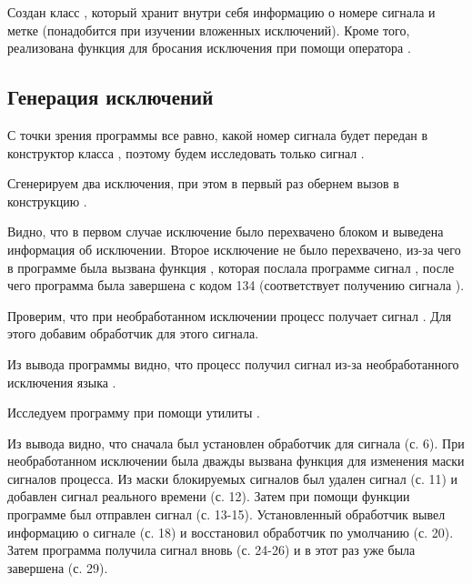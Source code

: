 Создан класс , который хранит внутри себя информацию о номере сигнала и метке (понадобится при изучении вложенных исключений). Кроме того, реализована функция  для бросания исключения при помощи оператора .

\subsection{Генерация исключений}

С точки зрения программы все равно, какой номер сигнала будет передан в конструктор класса , поэтому будем исследовать только сигнал .

Сгенерируем два исключения, при этом в первый раз обернем вызов  в конструкцию .


Видно, что в первом случае исключение было перехвачено блоком  и выведена информация об исключении. Второе исключение не было перехвачено, из-за чего в программе была вызвана функция , которая послала программе сигнал , после чего программа была завершена с кодом 134 (соответствует получению сигнала ).

Проверим, что при необработанном исключении процесс получает сигнал . Для этого добавим обработчик для этого сигнала.


Из вывода программы видно, что процесс получил сигнал  из-за необработанного исключения языка .

Исследуем программу  при помощи утилиты .


Из вывода видно, что сначала был установлен обработчик для сигнала  (с. 6). При необработанном исключении была дважды вызвана функция  для изменения маски сигналов процесса. Из маски блокируемых сигналов был удален сигнал  (с. 11) и добавлен сигнал реального времени (с. 12). Затем при помощи функции  программе был отправлен сигнал  (с. 13-15). Установленный обработчик вывел информацию о сигнале (с. 18) и восстановил обработчик по умолчанию (с. 20). Затем программа получила сигнал  вновь (с. 24-26) и в этот раз уже была завершена (с. 29).

